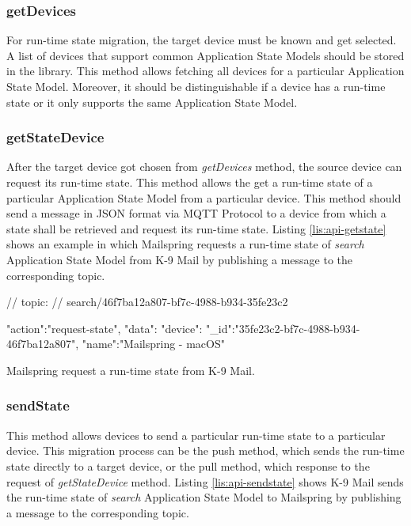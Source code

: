 \subsubsection{getDevices}
For run-time state migration, the target device must be known and get selected. A list of devices that support common Application State Models should be stored in the library. This method allows fetching all devices for a particular Application State Model. Moreover, it should be distinguishable if a device has a run-time state or it only supports the same Application State Model.

\subsubsection{getStateDevice}
After the target device got chosen from \textit{getDevices} method, the source device can request its run-time state. This method allows the get a run-time state of a particular Application State Model from a particular device. This method should send a message in JSON format via MQTT Protocol to a device from which a state shall be retrieved and request its run-time state. Listing \ref{lis:api-getstate} shows an example in which Mailspring requests a run-time state of \textit{search} Application State Model from K-9 Mail by publishing a message to the corresponding topic.

\FloatBarrier
\begin{code}
\begin{js2}
// topic:
// search/46f7ba12a807-bf7c-4988-b934-35fe23c2
\end{js2}

\begin{json}
{
   "action":"request-state",
   "data":{
      "device":{
         "_id":"35fe23c2-bf7c-4988-b934-46f7ba12a807",
         "name":"Mailspring - macOS"
      }
   }
}
\end{json}
\caption{Mailspring request a run-time state from K-9 Mail.}
\label{lis:api-getstate}
\end{code}
\FloatBarrier

\subsubsection{sendState}
This method allows devices to send a particular run-time state to a particular device. This migration process can be the push method, which sends the run-time state directly to a target device, or the pull method, which response to the request of \textit{getStateDevice} method. Listing \ref{lis:api-sendstate} shows K-9 Mail sends the run-time state of \textit{search} Application State Model to Mailspring by publishing a message to the corresponding topic.


